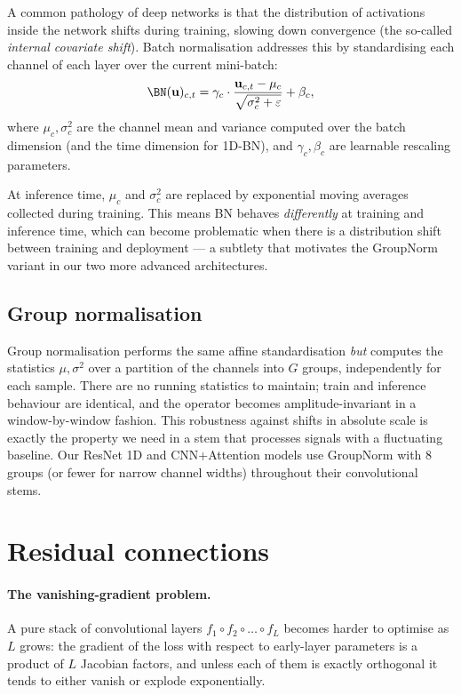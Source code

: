 A common pathology of deep networks is that the distribution of
activations inside the network shifts during training, slowing down
convergence (the so-called \emph{internal covariate shift}). Batch
normalisation \cite{ioffe2015batch} addresses this by standardising
each channel of each layer over the current mini-batch:
\begin{equation}
    \BN(\mathbf{u})_{c, t} = \gamma_c \cdot \frac{\mathbf{u}_{c, t} - \mu_c}{\sqrt{\sigma_c^2 + \varepsilon}} + \beta_c,
    \label{eq:bn}
\end{equation}
where $\mu_c, \sigma_c^2$ are the channel mean and variance computed
over the batch dimension (and the time dimension for 1D-BN), and
$\gamma_c, \beta_c$ are learnable rescaling parameters.

At inference time, $\mu_c$ and $\sigma_c^2$ are replaced by exponential
moving averages collected during training. This means BN behaves
\emph{differently} at training and inference time, which can become
problematic when there is a distribution shift between training and
deployment --- a subtlety that motivates the GroupNorm variant in our
two more advanced architectures.

\subsection{Group normalisation}
\label{sec:gn-theory}

Group normalisation \cite{wu2018group} performs the same affine
standardisation \emph{but} computes the statistics
$\mu, \sigma^2$ over a partition of the channels into $G$ groups,
independently for each sample. There are no running statistics to
maintain; train and inference behaviour are identical, and the
operator becomes amplitude-invariant in a window-by-window fashion.
This robustness against shifts in absolute scale is exactly the
property we need in a stem that processes signals with a fluctuating
baseline. Our ResNet 1D and CNN+Attention models use GroupNorm with $8$
groups (or fewer for narrow channel widths) throughout their
convolutional stems.

\section{Residual connections}
\label{sec:resnet-theory}

\paragraph{The vanishing-gradient problem.}
A pure stack of convolutional layers $f_1 \circ f_2 \circ \dots \circ f_L$
becomes harder to optimise as $L$ grows: the gradient of the loss with
respect to early-layer parameters is a product of $L$ Jacobian factors,
and unless each of them is exactly orthogonal it tends to either
vanish or explode exponentially.

